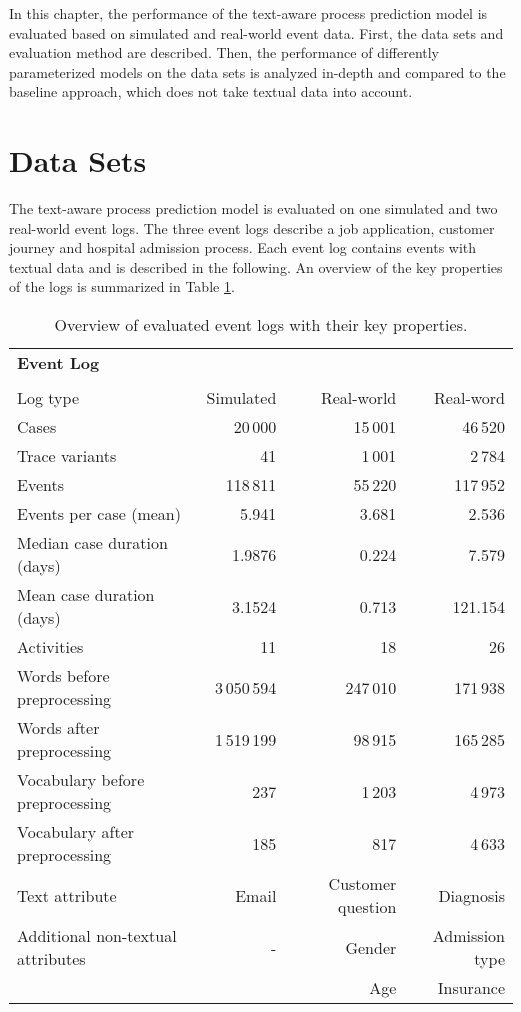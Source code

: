 In this chapter, the performance of the text-aware process prediction model is evaluated based on simulated and real-world event data.
First, the data sets and evaluation method are described. Then, the performance of differently parameterized models on the data sets is analyzed in-depth and compared to the baseline approach, which does not take textual data into account.


\section{Data Sets}

The text-aware process prediction model is evaluated on one simulated and two real-world event logs.
The three event logs describe a job application, customer journey and hospital admission process.
Each event log contains events with textual data and is described in the following.
An overview of the key properties of the logs is summarized in Table \ref{tab:logs}.

\begin{table}[!htbp]
	\begin{tabularx}{\textwidth}{l r r r}
		\toprule
		\textbf{Event Log} & \heading{\textbf{Job}} & \heading{\textbf{Customer}} &\heading{\textbf{Hospital}}  \\
		& \heading{\textbf{Application}} & \heading{\textbf{Journey}} &\heading{\textbf{Admission}}  \\
		\midrule
		Log type & Simulated & Real-world & Real-word\\
		Cases & 20\,000& 15\,001& 46\,520\\
		Trace variants &41 & 1\,001 &2\,784 \\
		Events & 118\,811 & 55\,220 & 117\,952\\
		Events per case (mean) & 5.941& 3.681& 2.536\\
		Median case duration (days) & 1.9876 & 0.224& 7.579\\
		Mean case duration (days)& 3.1524 &  0.713 & 121.154\\
		Activities & 11 & 18 & 26\\
		Words before preprocessing & 3\,050\,594 &247\,010 &  171\,938\\
		Words after preprocessing  &1\,519\,199 &98\,915 & 165\,285\\
		Vocabulary before preprocessing & 237 & 1\,203 & 4\,973 \\
		Vocabulary after preprocessing & 185 & 817 & 4\,633\\
		Text attribute & Email& Customer question & Diagnosis\\
		Additional non-textual attributes & - & Gender& Admission type\\
		&  & Age& Insurance\\
		\bottomrule
	\end{tabularx}
	\caption[Overview of evaluated event logs]{Overview of evaluated event logs with their key properties.}
	\label{tab:logs}
\end{table}

